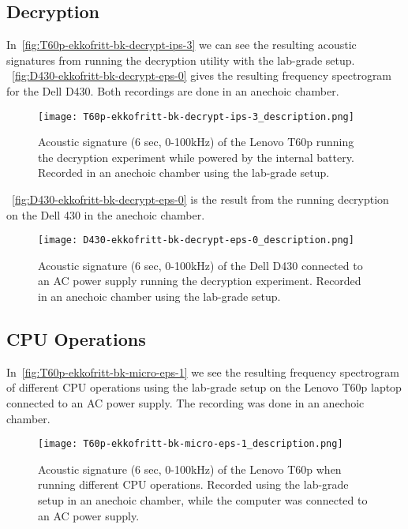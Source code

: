 \subsection{Decryption}\label{chp5:subsec:t60p_bk_results_decryption}
In~\autoref{fig:T60p-ekkofritt-bk-decrypt-ips-3} we can see the resulting acoustic signatures from running the decryption utility with the lab-grade setup.
~\autoref{fig:D430-ekkofritt-bk-decrypt-eps-0} gives the resulting frequency spectrogram for the Dell D430.
Both recordings are done in an anechoic chamber.

\begin{figure}[ht]
    \centering
    \texttt{[image: T60p-ekkofritt-bk-decrypt-ips-3\_description.png]}
    \caption{Acoustic signature (6 sec, 0-100kHz) of the Lenovo T60p running the decryption experiment while powered by the internal battery. 
    Recorded in an anechoic chamber using the lab-grade setup. }
    \label{fig:T60p-ekkofritt-bk-decrypt-ips-3}
\end{figure}


~\autoref{fig:D430-ekkofritt-bk-decrypt-eps-0} is the result from the running decryption on the Dell 430 in the anechoic chamber. 
\begin{figure}[ht]
    \centering
    \texttt{[image: D430-ekkofritt-bk-decrypt-eps-0\_description.png]}
    \caption{Acoustic signature (6 sec, 0-100kHz) of the Dell D430 connected to an \gls{AC} power supply running the decryption experiment.
        Recorded in an anechoic chamber using the lab-grade setup.}
    \label{fig:D430-ekkofritt-bk-decrypt-eps-0}
\end{figure}



\subsection{CPU Operations}\label{chp5:subsec:t60p_bk_results_micro}
In~\autoref{fig:T60p-ekkofritt-bk-micro-eps-1} we see the resulting frequency spectrogram of different \gls{CPU} operations using the lab-grade setup on the Lenovo T60p laptop connected to an \gls{AC} power supply.
The recording was done in an anechoic chamber.

\begin{figure}[ht]
    \centering
    \texttt{[image: T60p-ekkofritt-bk-micro-eps-1\_description.png]}
    \caption{Acoustic signature (6 sec, 0-100kHz) of the Lenovo T60p when running different \gls{CPU} operations.
        Recorded using the lab-grade setup in an anechoic chamber, while the computer was connected to an \gls{AC} power supply.}
    \label{fig:T60p-ekkofritt-bk-micro-eps-1}
\end{figure}

